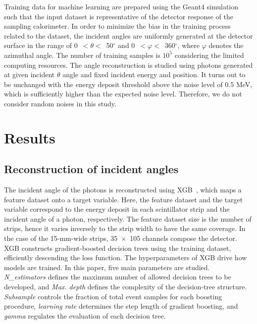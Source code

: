 \documentclass[12pt,times,draftclsnofoot,a4paper]{elsarticle}
\begin{document}
Training data for machine learning are prepared using the Geant4 simulation such that the input dataset is representative of the detector response of the sampling calorimeter. In order to minimize the bias in the training process related to the dataset, the incident angles are uniformly generated at the detector surface in the range of 0~$<\theta<$~50$^{\circ}$ and 0~$<\varphi<$~360$^{\circ}$, where $\varphi$ denotes the azimuthal angle. The number of training samples is $10^{5}$ considering the limited computing resources. The angle reconstruction is studied using photons generated at given incident $\theta$ angle and fixed incident energy and position. It turns out to be unchanged with the energy deposit threshold above the noise level of 0.5 MeV, which is sufficiently higher than the expected noise level. Therefore, we do not consider random noises in this study.

\section{Results}
\label{sec:res}
\subsection{Reconstruction of incident angles}
\label{sec:reco}

The incident angle of the photons is reconstructed using XGB~\cite{xgboost:2016}, which maps a feature dataset onto a target variable. Here, the feature dataset and the target variable correspond to the energy deposit in each scintillator strip and the incident angle of a photon, respectively. The feature dataset size is the number of strips, hence it varies inversely to the strip width to have the same coverage. In the case of the 15-mm-wide strips, 35~$\times$~105 channels compose the detector. XGB constructs gradient-boosted decision trees using the training dataset, efficiently descending the loss function. The hyperparameters of XGB drive how models are trained. In this paper, five main parameters are studied. \textit{N\_estimators} defines the maximum number of allowed decision trees to be developed, and \textit{Max. depth} defines the complexity of the decision-tree structure. \textit{Subsample} controls the fraction of total event samples for each boosting procedure, \textit{learning rate} determines the step length of gradient boosting, and \textit{gamma} regulates the evaluation of each decision tree.
\end{document}
